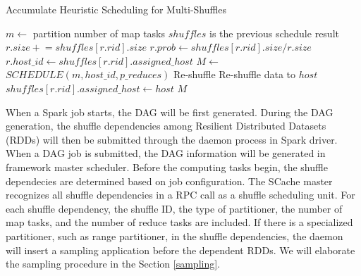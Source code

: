 \begin{minipage}{\columnwidth}
\begin{algorithm}[H]
\caption{Accumulate Heuristic Scheduling for Multi-Shuffles}
\label{mhminheap}
	\begin{algorithmic}[1]
	\small
		\State $m\gets$ partition number of map tasks
		\Comment $shuffles$ is the previous schedule result 
			\State $r.size \mathrel{+}= shuffles\left[r.rid\right].size$
				\State $r.prob\gets shuffles\left[r.rid\right].size / r.size$
				\State $r.host\_id\gets shuffles\left[r.rid\right].assigned\_host$
			\EndIf
		\EndFor
		\State $M\gets$ $SCHEDULE\left(m, host\_id, p\_reduces\right)$
			\Comment Re-shuffle
				\State Re-shuffle data to $host$
				\State $shuffles\left[r.rid\right].assigned\_host\gets host$
				\EndIf
			\EndFor
		\EndFor
		\Return $M$
	\EndProcedure
	\end{algorithmic}
\end{algorithm}
\end{minipage}

{\color{red}
When a Spark job starts, the DAG will be first generated. 
During the DAG generation, the shuffle dependencies among Resilient Distributed Datasets (RDDs) will then be submitted through the daemon process in Spark driver. 
}
{\color{blue}
When a DAG job is submitted, the DAG information will be generated in framework master scheduler. 
Before the computing tasks begin, the shuffle dependecies are determined based on job configuration.
}
The SCache master recognizes all shuffle dependencies in a RPC call as a shuffle scheduling unit.
For each shuffle dependency, the shuffle ID, the type of partitioner, the number of map tasks, and the number of reduce tasks are included.  If there is a specialized partitioner, such as range partitioner, in the shuffle dependencies, the daemon will insert a sampling application before the dependent RDDs. We will elaborate the sampling procedure in the Section \ref{sampling}.


